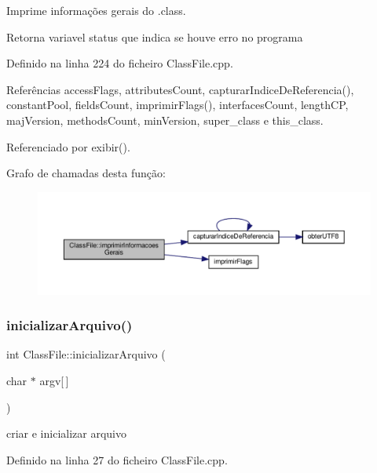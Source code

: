 Imprime informações gerais do .class. 

\begin{DoxyReturn}{Retorna}
variavel status que indica se houve erro no programa 
\end{DoxyReturn}


Definido na linha 224 do ficheiro Class\+File.\+cpp.



Referências access\+Flags, attributes\+Count, capturar\+Indice\+De\+Referencia(), constant\+Pool, fields\+Count, imprimir\+Flags(), interfaces\+Count, length\+CP, maj\+Version, methods\+Count, min\+Version, super\+\_\+class e this\+\_\+class.



Referenciado por exibir().

Grafo de chamadas desta função\+:\nopagebreak
\begin{figure}[H]
\begin{center}
\leavevmode
\includegraphics[width=350pt]{classClassFile_a482ed64fcd8a1b79d3622b3f59b5767a_cgraph}
\end{center}
\end{figure}
\mbox{\label{classClassFile_a5fa3d7587821ed1c8e3eabb94544da29}} 
\subsubsection{\texorpdfstring{inicializar\+Arquivo()}{inicializarArquivo()}}
{\footnotesize\ttfamily int Class\+File\+::inicializar\+Arquivo (\begin{DoxyParamCaption}\item[{char $\ast$}]{argv\mbox{[}$\,$\mbox{]} }\end{DoxyParamCaption})}



criar e inicializar arquivo 



Definido na linha 27 do ficheiro Class\+File.\+cpp.



